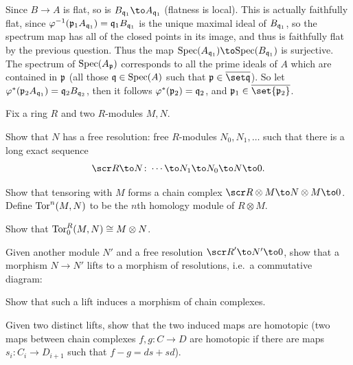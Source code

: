     \item Since $B\to A$ is flat, so is $B_{\q_1}\to A_{\q_1}$ (flatness is local).
    This is actually faithfully flat, since $\varphi^{-1}({{\frak p}}_1 A_{{{\frak q}}_1})={{\frak q}}_1 B_{{{\frak q}}_1}$ is the unique maximal ideal of $B_{{{\frak q}}_1}$, so the spectrum map has all of the closed points
    in its image, and thus is faithfully flat by the previous question.
    Thus the map $\spec(A_{\q_1})\to\spec(B_{\q_1})$ is surjective.
    The spectrum of ${\rm Spec}(A_{{\frak p}})$ corresponds to all the prime ideals of $A$ which are contained in ${{\frak p}}$ (all those ${{\frak q}}\in{\rm Spec}(A)$ such that $\p\in\cl{\set\q}$).
    So let $\varphi^*({{\frak p}}_2 A_{{{\frak q}}_1})={{\frak q}}_2 B_{{{\frak q}}_2}$, then it follows $\varphi^*({{\frak p}}_2)={{\frak q}}_2$, and $\p_1\in\cl{\set{\p_2}}$.
\eenum

\def\R{{\scr R}}

\bprob

    Fix a ring $R$ and two $R$-modules $M,N$.
    \benum
        \item Show that $N$ has a free resolution: free $R$-modules $N_0,N_1,\dots$ such that there is a long exact
        sequence
        $$ \R\to N \colon \cdots \to N_1 \to N_0 \to N \to 0 . $$
        \item Show that tensoring with $M$ forms a chain complex $\R\otimes M\to N\otimes M\to0$.
        Define ${\rm Tor}^n(M,N)$ to be the $n$th homology module of $R\otimes M$.
        \item Show that ${\rm Tor}^R_0(M,N)\cong M\otimes N$.
        \item Given another module $N'$ and a free resolution $\R'\to N'\to0$, show that a morphism $N\to N'$
        lifts to a morphism of resolutions, i.e.\ a commutative diagram:

        \centerline{}

        \item Show that such a lift induces a morphism of chain complexes.

        \item Given two distinct lifts, show that the two induced maps are homotopic (two maps between chain complexes
        $f,g\colon C\to D$ are {\emphcolor homotopic} if there are maps $s_i\colon C_i\to D_{i+1}$ such that
        $f-g=ds+sd$).

